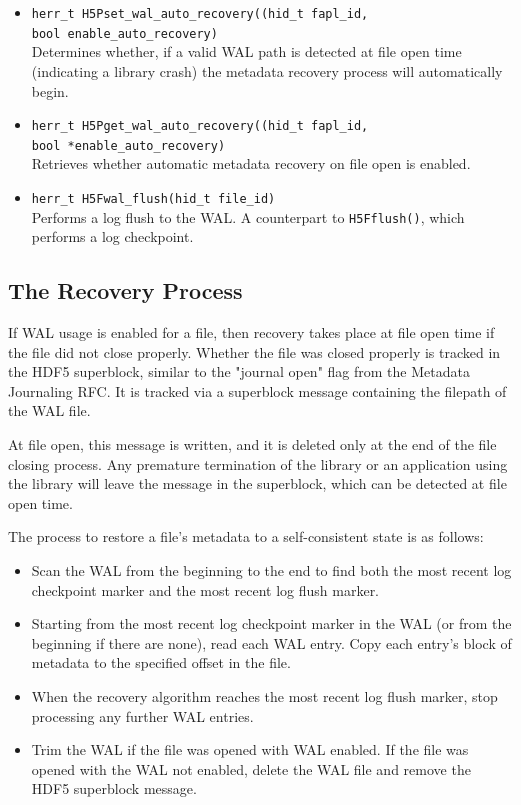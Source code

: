 \begin{itemize}
    \item \texttt{herr\_t H5Pset\_wal\_auto\_recovery((hid\_t fapl\_id,} \\
    \texttt{bool enable\_auto\_recovery)} \\
    Determines whether, if a valid WAL path is detected at file open time (indicating a library crash) the metadata recovery process will automatically begin. 

    \item \texttt{herr\_t H5Pget\_wal\_auto\_recovery((hid\_t fapl\_id,} \\
    \texttt{bool *enable\_auto\_recovery)} \\
    Retrieves whether automatic metadata recovery on file open is enabled.

    \item \texttt{herr\_t H5Fwal\_flush(hid\_t file\_id)} \\
    Performs a log flush to the WAL. A counterpart to \texttt{H5Fflush()}, which performs a log checkpoint.
\end{itemize}


\subsection{The Recovery Process}

If WAL usage is enabled for a file, then recovery takes place at file open time if the file did not close properly. Whether the file was closed properly is tracked in the HDF5 superblock, similar to the "journal open" flag from the Metadata Journaling RFC. It is tracked via a superblock message containing the filepath of the WAL file.

At file open, this message is written, and it is deleted only at the end of the file closing process. Any premature termination of the library or an application using the library will leave the message in the superblock, which can be detected at file open time. 
        
The process to restore a file's metadata to a self-consistent state is as follows:

\begin{itemize}
    \item Scan the WAL from the beginning to the end to find both the most recent log checkpoint marker and the most recent log flush marker.
    \item Starting from the most recent log checkpoint marker  in the WAL (or from the beginning if there are none), read each WAL entry. Copy each entry's block of metadata to the specified offset in the file.
    \item When the recovery algorithm reaches the most recent log flush marker, stop processing any further WAL entries.
    \item Trim the WAL if the file was opened with WAL enabled. If the file was opened with the WAL not enabled, delete the WAL file and remove the HDF5 superblock message.
\end{itemize}


